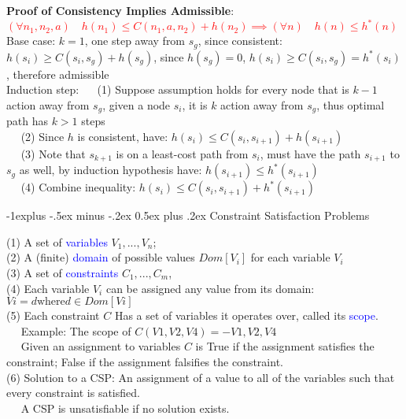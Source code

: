 \documentclass[10pt,landscape]{article}
\makeatletter
\renewcommand{\subsection}{\@startsection{subsection}{2}{0mm}%
                                {-1explus -.5ex minus -.2ex}%
                                {0.5ex plus .2ex}%
                                {\normalfont\normalsize\bfseries}}
\makeatother
\begin{document}
\begin{multicols}{2}
\textbf{Proof of Consistency Implies Admissible}: \textcolor{red}{$(\forall n_1, n_2, a) \quad h(n_1) \le C(n_1, a, n_2) + h(n_2) \implies (\forall n) \quad h(n) \le h^*(n)$}\\

Base case: $k=1$, one step away from $s_g$, since consistent: $h(s_i) \ge C(s_i, s_g) + h(s_g)$, since $h(s_g) =0$, $h(s_i) \ge C(s_i, s_g) = h^*(s_i)$, therefore admissible \\
Induction step:
$\quad$ (1) Suppose assumption holds for every node that is $k-1$ action away from $s_g$, given a node $s_i$, it is $k$ action away from $s_g$, thus optimal path has $k>1$ steps \\
$\quad$ (2) Since $h$ is consistent, have: $h(s_i) \le C(s_i, s_{i+1}) + h(s_{i+1})$ \\
$\quad$ (3) Note that $s_{k+1}$ is on a least-cost path from $s_i$, must have the path $s_{i+1}$ to $s_g$ as well, by induction hypothesis have: $h(s_{i+1}) \le h^*(s_{i+1})$ \\
$\quad$ (4) Combine inequality: $h(s_i) \le C(s_i, s_{i+1}) + h^*(s_{i+1})$

\newpage

\subsection{Constraint Satisfaction Problems}

(1) A set of \textcolor{blue}{variables} $V_1, ..., V_n$;  \\
(2) A (finite) \textcolor{blue}{domain} of possible values $Dom[V_i]$ for each variable $V_i$ \\
(3) A set of \textcolor{blue}{constraints} $C_1, ..., C_m$, \\
(4) Each variable $V_i$ can be assigned any value from its domain: $Vi = d \text{where} d \in Dom[Vi]$ \\
(5) Each constraint $C$ Has a set of variables it operates over, called its \textcolor{blue}{scope}.\\
$\quad$ Example: The scope of $C(V1, V2, V4) =- {V1, V2, V4}$ \\
$\quad$ Given an assignment to variables $C$ is True if the assignment satisfies the constraint; False if the assignment falsifies the constraint. \\
(6) Solution to a CSP: An assignment of a value to all of the variables such that every constraint is satisfied.  \\
$\quad$ A CSP is unsatisfiable if no solution exists.


\end{multicols}
\end{document}
